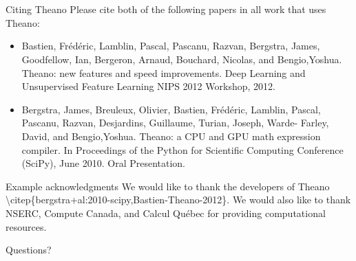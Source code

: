 \documentclass[utf8x,hyperref={pdfpagelabels=false}]{beamer}
\begin{document}
\section*{}
\begin{frame}{Citing Theano}
Please cite both of the following papers in all work that uses Theano:
  \begin{itemize}
  \item Bastien, Frédéric, Lamblin, Pascal, Pascanu, Razvan, Bergstra, James, Goodfellow, Ian, Bergeron, Arnaud, Bouchard, Nicolas, and
     Bengio,Yoshua. Theano: new features and speed improvements. Deep Learning and Unsupervised Feature Learning NIPS 2012
    Workshop, 2012.
  \item Bergstra, James, Breuleux, Olivier, Bastien, Frédéric, Lamblin, Pascal, Pascanu, Razvan, Desjardins, Guillaume, Turian, Joseph, Warde-
     Farley, David, and Bengio,Yoshua. Theano: a CPU and GPU math expression compiler. In Proceedings of the Python for Scientific
      Computing Conference (SciPy), June 2010. Oral Presentation.
  \end{itemize}
\end{frame}

\begin{frame}{Example acknowledgments}
We would like to thank the developers of Theano \textbackslash citep\{bergstra+al:2010-scipy,Bastien-Theano-2012\}.
We would also like to thank NSERC, Compute Canada, and Calcul Québec for providing computational resources.
\end{frame}


\begin{frame}
\begin{center}

\Huge
Questions?
\end{center}
\end{frame}
\end{document}
